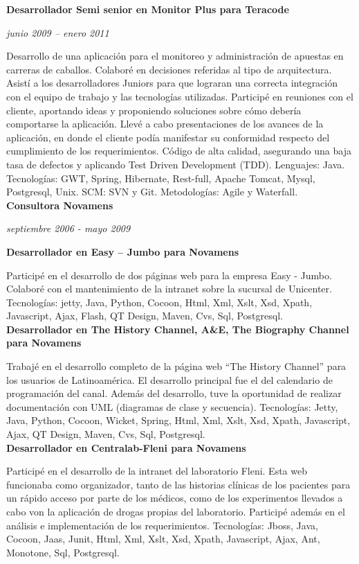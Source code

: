 \documentclass[a4paper,11pt]{article}
\begin{document}
\noindent \textbf{Desarrollador Semi senior en Monitor Plus para Teracode}

\noindent \emph{junio 2009 –  enero 2011}

\noindent Desarrollo de una aplicación para el monitoreo y administración de
apuestas en carreras de caballos.  Colaboré en decisiones referidas al tipo de
arquitectura.
Asistí a los desarrolladores Juniors para que lograran una correcta integración
con el equipo de trabajo y las tecnologías utilizadas.  Participé en reuniones
con el cliente, aportando ideas y proponiendo soluciones sobre cómo debería
comportarse la aplicación.
Llevé a cabo presentaciones de los avances de la aplicación, en donde el
cliente podía manifestar su conformidad respecto del cumplimiento de los
requerimientos.  Código de alta calidad, asegurando una baja tasa de defectos y
aplicando Test Driven Development (TDD).
Lenguajes: Java.
Tecnologías: GWT, Spring, Hibernate, Rest-full, Apache Tomcat, Mysql,
Postgresql, Unix.  SCM: SVN y Git.
Metodologías: Agile y Waterfall. \\


\noindent \textbf{Consultora Novamens}

\noindent \emph{septiembre 2006 - mayo 2009}

\noindent \textbf{Desarrollador en Easy – Jumbo para Novamens}

\noindent Participé en el desarrollo de dos páginas web para la empresa Easy -
Jumbo.  Colaboré con el mantenimiento de la intranet sobre la sucursal de
Unicenter.
Tecnologías: jetty, Java, Python, Cocoon, Html, Xml, Xslt, Xsd, Xpath,
Javascript, Ajax, Flash, QT Design, Maven, Cvs, Sql, Postgresql. \\

\noindent \textbf{Desarrollador en The History Channel, A\&E, The Biography
Channel para Novamens}

\noindent Trabajé en el desarrollo completo de la página web “The History
Channel” para los usuarios de Latinoamérica. El desarrollo principal fue el del
calendario de programación del canal.  Además del desarrollo, tuve la
oportunidad de realizar documentación con UML (diagramas de clase y secuencia).
Tecnologías: Jetty, Java, Python, Cocoon, Wicket, Spring, Html, Xml, Xslt, Xsd,
Xpath, Javascript, Ajax, QT Design, Maven, Cvs, Sql, Postgresql. \\

\noindent \textbf{Desarrollador en Centralab-Fleni para Novamens}

\noindent Participé en el desarrollo de la intranet del laboratorio Fleni. Esta
web funcionaba como organizador, tanto de las historias clínicas de los
pacientes para un rápido acceso por parte de los médicos, como de los
experimentos llevados a cabo von la aplicación de drogas propias del
laboratorio. Participé además en el análisis e implementación de los
requerimientos.  Tecnologías: Jboss, Java, Cocoon, Jaas, Junit, Html, Xml,
Xslt, Xsd, Xpath, Javascript, Ajax, Ant, Monotone, Sql, Postgresql. \\ 
\end{document}
